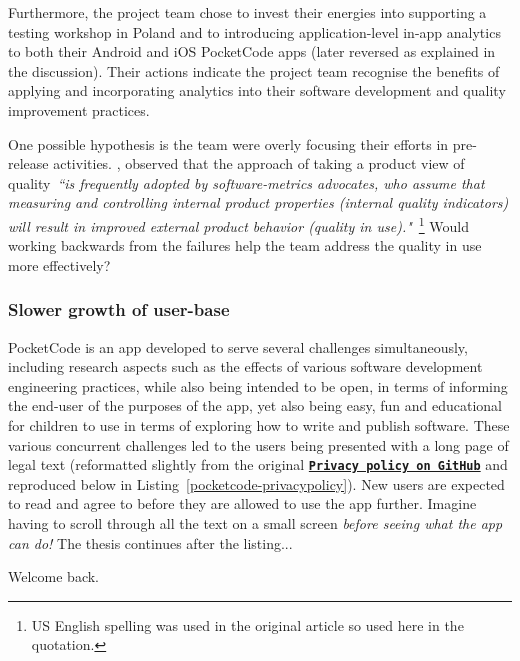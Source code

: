 Furthermore, the project team chose to invest their energies into supporting a testing workshop in Poland and to introducing application-level in-app analytics to both their Android and iOS PocketCode apps (later reversed as explained in the discussion). Their actions indicate the project team recognise the benefits of applying and incorporating analytics into their software development and quality improvement practices.


One possible hypothesis is the team were overly focusing their efforts in pre-release activities. \citep{kitchenham1996_software_quality_elusive_target}, observed that the approach of taking a product view of quality~\emph{``is frequently adopted by software-metrics advocates, who assume that measuring and controlling internal product properties (internal quality indicators) will result in improved external product behavior (quality in use)."}~\footnote{US English spelling was used in the original article so used here in the quotation.} Would working backwards from the failures help the team address the quality in use more effectively?








\subsubsection{Slower growth of user-base}
PocketCode is an app developed to serve several challenges simultaneously, including research aspects such as the effects of various software development engineering practices, while also being intended to be open, in terms of informing the end-user of the purposes of the app, yet also being easy, fun and educational for children to use in terms of exploring how to write and publish software. These various concurrent challenges led to the users being presented with a long page of legal text (reformatted slightly from the original \href{https://github.com/Catrobat/Catroid/blob/develop/catroid/src/main/res/values/strings.xml}{\textbf{\texttt{Privacy policy on GitHub}}} and reproduced below in Listing~\ref{pocketcode-privacypolicy}). New users are expected to read and agree to before they are allowed to use the app further. Imagine having to scroll through all the text on a small screen \emph{before seeing what the app can do!} The thesis continues after the listing...



Welcome back. 

